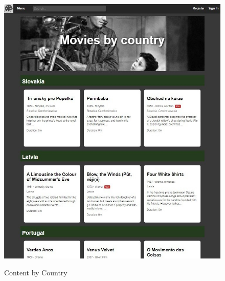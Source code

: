 \documentclass[letterpaper,twocolumn]{article}
\begin{document}
\clearpage
\begin{figure}[h!]
\centering
\includegraphics[scale=1.1]{images/Content_by_country.jpg}\\[0.2cm] 
\caption{Content by Country}
\label{Contentpage}
\end{figure}
\end{document}
